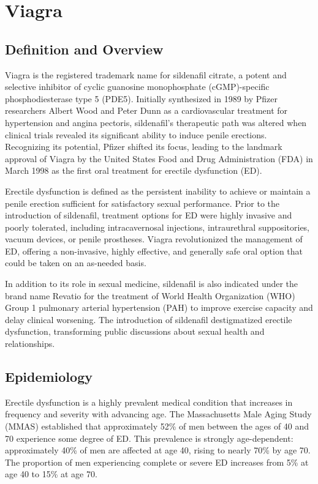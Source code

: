 \chapter{Viagra}

\section*{Definition and Overview}
Viagra is the registered trademark name for sildenafil citrate, a potent and selective inhibitor of cyclic guanosine monophosphate (cGMP)-specific phosphodiesterase type 5 (PDE5). Initially synthesized in 1989 by Pfizer researchers Albert Wood and Peter Dunn as a cardiovascular treatment for hypertension and angina pectoris, sildenafil's therapeutic path was altered when clinical trials revealed its significant ability to induce penile erections. Recognizing its potential, Pfizer shifted its focus, leading to the landmark approval of Viagra by the United States Food and Drug Administration (FDA) in March 1998 as the first oral treatment for erectile dysfunction (ED).

Erectile dysfunction is defined as the persistent inability to achieve or maintain a penile erection sufficient for satisfactory sexual performance. Prior to the introduction of sildenafil, treatment options for ED were highly invasive and poorly tolerated, including intracavernosal injections, intraurethral suppositories, vacuum devices, or penile prostheses. Viagra revolutionized the management of ED, offering a non-invasive, highly effective, and generally safe oral option that could be taken on an as-needed basis.

In addition to its role in sexual medicine, sildenafil is also indicated under the brand name Revatio for the treatment of World Health Organization (WHO) Group 1 pulmonary arterial hypertension (PAH) to improve exercise capacity and delay clinical worsening. The introduction of sildenafil destigmatized erectile dysfunction, transforming public discussions about sexual health and relationships.

\section*{Epidemiology}
Erectile dysfunction is a highly prevalent medical condition that increases in frequency and severity with advancing age. The Massachusetts Male Aging Study (MMAS) established that approximately 52\% of men between the ages of 40 and 70 experience some degree of ED. This prevalence is strongly age-dependent: approximately 40\% of men are affected at age 40, rising to nearly 70\% by age 70. The proportion of men experiencing complete or severe ED increases from 5\% at age 40 to 15\% at age 70.

